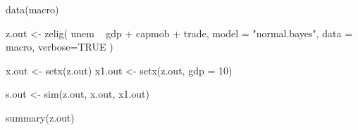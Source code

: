 data(macro)

z.out <- zelig(
               unem ~ gdp + capmob + trade,
               model = "normal.bayes", 
               data = macro,
               verbose=TRUE
               )

x.out <- setx(z.out)
x1.out <- setx(z.out, gdp = 10)

s.out <- sim(z.out, x.out, x1.out)

summary(z.out)
